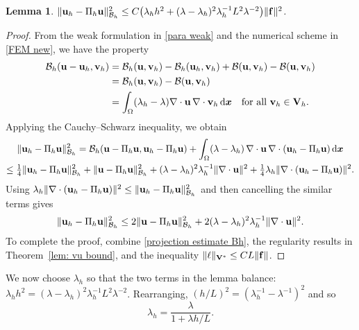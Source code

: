 \documentclass[11pt]{article}
\newcommand{\calB}{\mathcal{B}}
\newcommand{\vf}{{\bf f}}
\newcommand{\vu}{{\bf u}}
\newcommand{\vv}{{\bf v}}
\newcommand{\vV}{{\bf V}}
\newcommand{\bsx}{{\boldsymbol{x}}}
\numberwithin{equation}{section}
\newcommand{\ud}{\mathrm{d}}
\newtheorem{lemma}[theorem]{Lemma}
\begin{document}
\begin{lemma}\label{lem: balance terms}
$\|\vu_h-\Pi_h \vu\|_{\calB_h}^2\le C\bigl(\lambda_h h^2
    +(\lambda-\lambda_h)^2\lambda_h^{-1}L^2\lambda^{-2}\bigr)\|\vf\|^2$.
\end{lemma}
\begin{proof}
From the weak formulation in \eqref{para weak} and the numerical scheme   in
\eqref{FEM new}, we have the property
\begin{align}\label{equ:Gal ort}
\calB_h(\vu-\vu_h, \vv_h) &= \calB_h(\vu, \vv_h)
    -\calB_h(\vu_h,\vv_h)+\calB(\vu,\vv_h)-\calB(\vu,\vv_h) \nonumber \\
&=\calB_h(\vu,\vv_h)-\calB(\vu,\vv_h)  \nonumber \\
&=\int_\Omega(\lambda_h-\lambda)\nabla\cdot\vu\,\nabla\cdot\vv_h\,\ud\bsx
\quad\text{for all $\vv_h \in \vV_h$.}
\end{align}
Applying the Cauchy--Schwarz inequality, we obtain
\begin{multline*}
\|\vu_h-\Pi_h \vu\|_{\calB_h}^2=\calB_h(\vu-\Pi_h\vu,\vu_h-\Pi_h\vu)
    +\int_\Omega(\lambda-\lambda_h)\,\nabla\cdot\vu\,\nabla\cdot
    (\vu_h-\Pi_h\vu)\,\ud\bsx\\
    \le\tfrac14\|\vu_h-\Pi_h \vu\|_{\calB_h}^2+\|\vu-\Pi_h\vu\|_{\calB_h}^2
    +(\lambda-\lambda_h)^2\lambda_h^{-1}\|\nabla\cdot\vu\|^2
    +\tfrac{1}{4}\lambda_h\|\nabla\cdot(\vu_h-\Pi_h\vu)\|^2.
\end{multline*}
Using $\lambda_h\|\nabla\cdot(\vu_h-\Pi_h\vu)\|^2
\le\|\vu_h-\Pi_h\vu\|_{\calB_h}^2$ and then cancelling the similar terms gives
\[
\|\vu_h-\Pi_h\vu\|_{\calB_h}^2\le2\|\vu-\Pi_h\vu\|_{\calB_h}^2
    +2(\lambda-\lambda_h)^2\lambda_h^{-1}\|\nabla\cdot\vu\|^2.
\]
To complete the proof, combine \eqref{projection estimate Bh}, the regularity
results in Theorem~\ref{lem: vu bound}, and the inequality $\|\ell\|_{\vV^*}
\le CL\|\vf\|$.
\end{proof}

We now choose $\lambda_h$ so that the two terms in the lemma balance:
$\lambda_hh^2=(\lambda-\lambda_h)^2\lambda_h^{-1}L^2\lambda^{-2}$.
Rearranging, $(h/L)^2=(\lambda_h^{-1}-\lambda^{-1})^2$ and so
\begin{equation}\label{eq: lambda_h}
\lambda_h=\frac{\lambda}{1+\lambda h/L}.
\end{equation}
\end{document}
